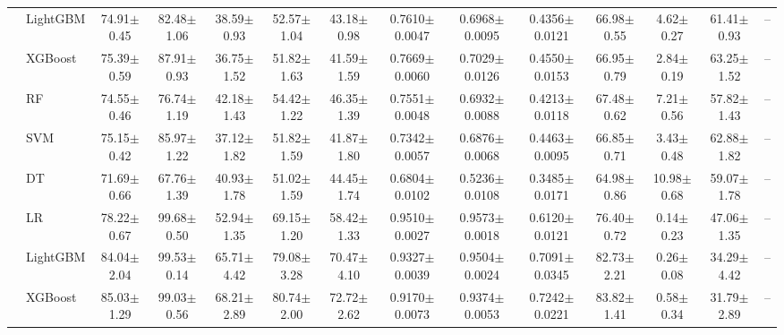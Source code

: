 \begin{tabular}{@{}llcccccccccccc@{}}
 & LightGBM & 74.91{\tiny$\pm$0.45} & 82.48{\tiny$\pm$1.06} & 38.59{\tiny$\pm$0.93} & 52.57{\tiny$\pm$1.04} & 43.18{\tiny$\pm$0.98} & 0.7610{\tiny$\pm$0.0047} & 0.6968{\tiny$\pm$0.0095} & 0.4356{\tiny$\pm$0.0121} & 66.98{\tiny$\pm$0.55} & 4.62{\tiny$\pm$0.27} & 61.41{\tiny$\pm$0.93} & --\\
 & XGBoost & 75.39{\tiny$\pm$0.59} & 87.91{\tiny$\pm$0.93} & 36.75{\tiny$\pm$1.52} & 51.82{\tiny$\pm$1.63} & 41.59{\tiny$\pm$1.59} & 0.7669{\tiny$\pm$0.0060} & 0.7029{\tiny$\pm$0.0126} & 0.4550{\tiny$\pm$0.0153} & 66.95{\tiny$\pm$0.79} & 2.84{\tiny$\pm$0.19} & 63.25{\tiny$\pm$1.52} & --\\
 & RF & 74.55{\tiny$\pm$0.46} & 76.74{\tiny$\pm$1.19} & 42.18{\tiny$\pm$1.43} & 54.42{\tiny$\pm$1.22} & 46.35{\tiny$\pm$1.39} & 0.7551{\tiny$\pm$0.0048} & 0.6932{\tiny$\pm$0.0088} & 0.4213{\tiny$\pm$0.0118} & 67.48{\tiny$\pm$0.62} & 7.21{\tiny$\pm$0.56} & 57.82{\tiny$\pm$1.43} & --\\
 & SVM & 75.15{\tiny$\pm$0.42} & 85.97{\tiny$\pm$1.22} & 37.12{\tiny$\pm$1.82} & 51.82{\tiny$\pm$1.59} & 41.87{\tiny$\pm$1.80} & 0.7342{\tiny$\pm$0.0057} & 0.6876{\tiny$\pm$0.0068} & 0.4463{\tiny$\pm$0.0095} & 66.85{\tiny$\pm$0.71} & 3.43{\tiny$\pm$0.48} & 62.88{\tiny$\pm$1.82} & --\\
 & DT & 71.69{\tiny$\pm$0.66} & 67.76{\tiny$\pm$1.39} & 40.93{\tiny$\pm$1.78} & 51.02{\tiny$\pm$1.59} & 44.45{\tiny$\pm$1.74} & 0.6804{\tiny$\pm$0.0102} & 0.5236{\tiny$\pm$0.0108} & 0.3485{\tiny$\pm$0.0171} & 64.98{\tiny$\pm$0.86} & 10.98{\tiny$\pm$0.68} & 59.07{\tiny$\pm$1.78} & --\\
\midrule
{} & LR & 78.22{\tiny$\pm$0.67} & 99.68{\tiny$\pm$0.50} & 52.94{\tiny$\pm$1.35} & 69.15{\tiny$\pm$1.20} & 58.42{\tiny$\pm$1.33} & 0.9510{\tiny$\pm$0.0027} & 0.9573{\tiny$\pm$0.0018} & 0.6120{\tiny$\pm$0.0121} & 76.40{\tiny$\pm$0.72} & 0.14{\tiny$\pm$0.23} & 47.06{\tiny$\pm$1.35} & --\\
 & LightGBM & 84.04{\tiny$\pm$2.04} & 99.53{\tiny$\pm$0.14} & 65.71{\tiny$\pm$4.42} & 79.08{\tiny$\pm$3.28} & 70.47{\tiny$\pm$4.10} & 0.9327{\tiny$\pm$0.0039} & 0.9504{\tiny$\pm$0.0024} & 0.7091{\tiny$\pm$0.0345} & 82.73{\tiny$\pm$2.21} & 0.26{\tiny$\pm$0.08} & 34.29{\tiny$\pm$4.42} & --\\
 & XGBoost & 85.03{\tiny$\pm$1.29} & 99.03{\tiny$\pm$0.56} & 68.21{\tiny$\pm$2.89} & 80.74{\tiny$\pm$2.00} & 72.72{\tiny$\pm$2.62} & 0.9170{\tiny$\pm$0.0073} & 0.9374{\tiny$\pm$0.0053} & 0.7242{\tiny$\pm$0.0221} & 83.82{\tiny$\pm$1.41} & 0.58{\tiny$\pm$0.34} & 31.79{\tiny$\pm$2.89} & --\\

\end{tabular}
